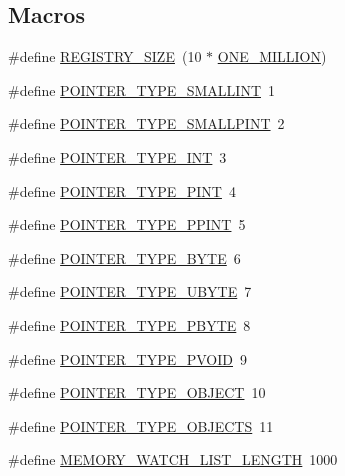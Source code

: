 \subsection*{Macros}
\begin{DoxyCompactItemize}
\item 
\#define \mbox{\hyperlink{_g_a_l_o_i_s_2memory_8_c_a56b4909adf7b15ea587d4f34bd639afa}{R\+E\+G\+I\+S\+T\+R\+Y\+\_\+\+S\+I\+ZE}}~(10 $\ast$ \mbox{\hyperlink{galois_8h_a6a146c1b2155b03eb2ffa3f4ba755034}{O\+N\+E\+\_\+\+M\+I\+L\+L\+I\+ON}})
\item 
\#define \mbox{\hyperlink{_g_a_l_o_i_s_2memory_8_c_a2cc32fb1b343c1194a539c68799dafdc}{P\+O\+I\+N\+T\+E\+R\+\_\+\+T\+Y\+P\+E\+\_\+\+S\+M\+A\+L\+L\+I\+NT}}~1
\item 
\#define \mbox{\hyperlink{_g_a_l_o_i_s_2memory_8_c_a8d48a4c82e88db99bdb1c3a89851a70e}{P\+O\+I\+N\+T\+E\+R\+\_\+\+T\+Y\+P\+E\+\_\+\+S\+M\+A\+L\+L\+P\+I\+NT}}~2
\item 
\#define \mbox{\hyperlink{_g_a_l_o_i_s_2memory_8_c_a3f4e6040e4715df597896976e9b770e2}{P\+O\+I\+N\+T\+E\+R\+\_\+\+T\+Y\+P\+E\+\_\+\+I\+NT}}~3
\item 
\#define \mbox{\hyperlink{_g_a_l_o_i_s_2memory_8_c_a388d01a62105db0538cc7ad5a2ab695d}{P\+O\+I\+N\+T\+E\+R\+\_\+\+T\+Y\+P\+E\+\_\+\+P\+I\+NT}}~4
\item 
\#define \mbox{\hyperlink{_g_a_l_o_i_s_2memory_8_c_a00eb4c8fab5de7adf16a975db1b50b88}{P\+O\+I\+N\+T\+E\+R\+\_\+\+T\+Y\+P\+E\+\_\+\+P\+P\+I\+NT}}~5
\item 
\#define \mbox{\hyperlink{_g_a_l_o_i_s_2memory_8_c_a341f7169df7a4bd72319fa9e76c2f03b}{P\+O\+I\+N\+T\+E\+R\+\_\+\+T\+Y\+P\+E\+\_\+\+B\+Y\+TE}}~6
\item 
\#define \mbox{\hyperlink{_g_a_l_o_i_s_2memory_8_c_ab1c34ee381236356f380cd6ec692771b}{P\+O\+I\+N\+T\+E\+R\+\_\+\+T\+Y\+P\+E\+\_\+\+U\+B\+Y\+TE}}~7
\item 
\#define \mbox{\hyperlink{_g_a_l_o_i_s_2memory_8_c_a5017c95ebde3cdbd74138392c959fbbc}{P\+O\+I\+N\+T\+E\+R\+\_\+\+T\+Y\+P\+E\+\_\+\+P\+B\+Y\+TE}}~8
\item 
\#define \mbox{\hyperlink{_g_a_l_o_i_s_2memory_8_c_adffaa29b549b79d5035bba5fb5c3a93b}{P\+O\+I\+N\+T\+E\+R\+\_\+\+T\+Y\+P\+E\+\_\+\+P\+V\+O\+ID}}~9
\item 
\#define \mbox{\hyperlink{_g_a_l_o_i_s_2memory_8_c_ae50e26c341156a8fac9bd16e4a506ed5}{P\+O\+I\+N\+T\+E\+R\+\_\+\+T\+Y\+P\+E\+\_\+\+O\+B\+J\+E\+CT}}~10
\item 
\#define \mbox{\hyperlink{_g_a_l_o_i_s_2memory_8_c_aa86c4813374e2199af8b8442b550b59b}{P\+O\+I\+N\+T\+E\+R\+\_\+\+T\+Y\+P\+E\+\_\+\+O\+B\+J\+E\+C\+TS}}~11
\item 
\#define \mbox{\hyperlink{_g_a_l_o_i_s_2memory_8_c_ac1bad4721ae85c6655a58ee471fca338}{M\+E\+M\+O\+R\+Y\+\_\+\+W\+A\+T\+C\+H\+\_\+\+L\+I\+S\+T\+\_\+\+L\+E\+N\+G\+TH}}~1000
\end{DoxyCompactItemize}
